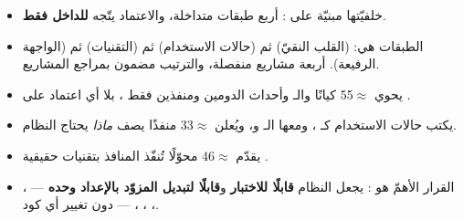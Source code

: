 \begin{summary}
\begin{itemize}
\item {} خلفيّتها مبنيّة على : أربع طبقات
  متداخلة، والاعتماد يتّجه \textbf{للداخل فقط}.
\item الطبقات هي:  (القلب النقيّ) ثم  (حالات الاستخدام)
  ثم  (التقنيات) ثم  (الواجهة الرفيعة). أربعة مشاريع
   منفصلة، والترتيب مضمون بمراجع المشاريع.
\item {} يحوي $\approx$55 كيانًا والـ  وأحداث الدومين ومنفذين
  فقط \en{(}\en{, }\en{)}، بلا أي
  اعتماد على .
\item {} يكتب حالات الاستخدام كـ ، ومعها الـ 
  و، ويُعلن $\approx$33 منفذًا يصف \emph{ماذا} يحتاج النظام.
\item {} يقدّم $\approx$46 محوّلًا تُنفّذ المنافذ بتقنيات حقيقية
  .
\item القرار الأهمّ هو : يجعل النظام \textbf{قابلًا للاختبار}
  و\textbf{قابلًا لتبديل المزوّد بالإعداد وحده} — ،
  ، ، ،
   — دون تغيير أي كود.
\end{itemize}
\end{summary}
